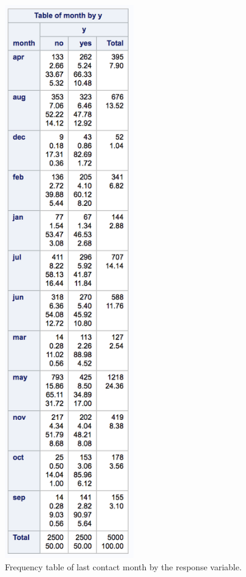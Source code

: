 \documentclass[]{article}
\begin{document}
\begin{figure}
  \centering
    \includegraphics[width=0.5\textwidth]{images/fig12_month.png}
  \caption{Frequency table of last contact month by the response variable.}
  \label{fig12}
\end{figure}
\end{document}
